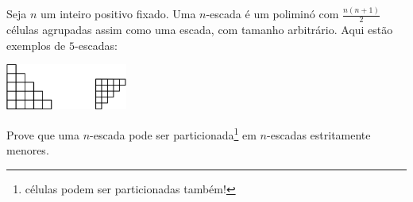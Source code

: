 Seja $n$ um inteiro positivo fixado. Uma $n$-escada é um poliminó com $\frac{n(n+1)}{2}$ células agrupadas assim como uma escada, com tamanho arbitrário. Aqui estão exemplos de $5$-escadas:

\begin{center}
	\includegraphics[width = 0.3\textwidth]{pic.png}
\end{center}

Prove que uma $n$-escada pode ser particionada\footnote{células podem ser particionadas também!} em $n$-escadas estritamente menores.
